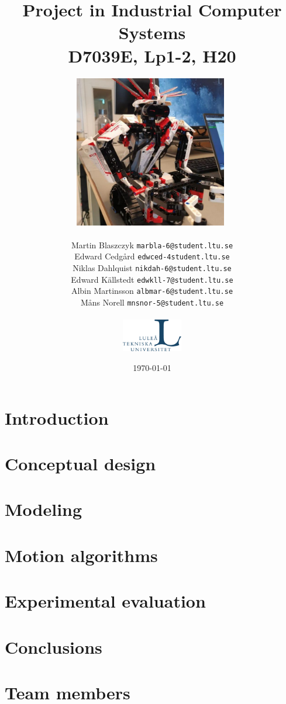 \documentclass{report}
\title{Project in Industrial Computer Systems\\
D7039E, Lp1-2, H20}
\author{\includegraphics[width=0.5\textwidth]{chapters/img/robot.jpg}\ \\ \\
Martin Blaszczyk {\tt marbla-6@student.ltu.se}\\
Edward Cedgård {\tt edwced-4student.ltu.se}\\
Niklas Dahlquist {\tt nikdah-6@student.ltu.se}\\ 
Edward Källstedt {\tt edwkll-7@student.ltu.se}\\
Albin Martinsson {\tt albmar-6@student.ltu.se}\\
Måns Norell {\tt mnsnor-5@student.ltu.se}\\ \\
\includegraphics[width=0.2\textwidth]{chapters/img/ltu_swe.jpg}}
\date{\today}
\begin{document}
\maketitle
\begin{abstract}
\end{abstract}

\chapter*{Introduction}


\chapter*{Conceptual design}


\chapter*{Modeling}


\chapter*{Motion algorithms}


\chapter*{Experimental evaluation}


\chapter*{Conclusions}


\appendix
\chapter{Team members}

 
\end{document}
